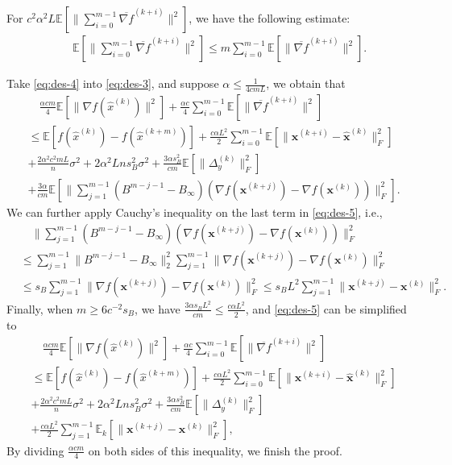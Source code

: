 \documentclass[10pt]{article}
\newcommand{\vx}{{\mathbf{x}}}
\newcommand{\EE}{\mathbb{E}}
\newcommand{\norm}[1]{\| #1 \|}
\begin{document}
For \(c^2\alpha^2L\EE[\norm{\sum_{i=0}^{m-1}\overline{\nabla f}^{(k+i)}}^2]\), we have the following estimate:
\begin{align}\label{eq:des-4}
    &\quad\EE[\norm{\sum_{i=0}^{m-1}\overline{\nabla f}^{(k+i)}}^2]\le m\sum_{i=0}^{m-1}\EE[\norm{\overline{\nabla f}^{(k+i)}}^2].
\end{align}

Take \eqref{eq:des-4} into \eqref{eq:des-3}, and suppose $\alpha \le \frac{1}{4cmL}$, we obtain that
\begin{align}\label{eq:des-5}
    &\quad\frac{\alpha cm}{4}\EE[\norm{\nabla f(\hat{x}^{(k)})}^2]+\frac{\alpha c}{4}\sum_{i=0}^{m-1}\EE[\norm{\overline{\nabla f}^{(k+i)}}^2]\\
    &\le \EE[f(\hat{x}^{(k)})-f(\hat{x}^{(k+m)})]+\frac{c\alpha L^2}{2}\sum_{i=0}^{m-1}\EE[\norm{\vx^{(k+i)}-\hat{\vx}^{(k)}}_F^2]\nonumber\\
    &+\frac{2\alpha^2c^2mL}{n}\sigma^2+2\alpha^2Lns_B^2\sigma^2+\frac{3\alpha s_B^2}{cm}\EE[\norm{\Delta_y^{(k)}}_F^2]\nonumber\\
    &+\frac{3\alpha}{cm}\EE[\norm{\sum_{j=1}^{m-1}(B^{m-j-1}-B_\infty)(\nabla f(\vx^{(k+j)})-\nabla f(\vx^{(k)}))}_F^2]\nonumber.
\end{align}
We can further apply Cauchy's inequality on the last term in \eqref{eq:des-5}, i.e.,
\begin{align*}
    &\quad\norm{\sum_{j=1}^{m-1}(B^{m-j-1}-B_\infty)(\nabla f(\vx^{(k+j)})-\nabla f(\vx^{(k)}))}_F^2\\
    &\le \sum_{j=1}^{m-1}\norm{B^{m-j-1}-B_\infty}_2^2\sum_{j=1}^{m-1}\norm{\nabla f(\vx^{(k+j)})-\nabla f(\vx^{(k)})}_F^2\\
    &\le s_B\sum_{j=1}^{m-1}\norm{\nabla f(\vx^{(k+j)})-\nabla f(\vx^{(k)})}_F^2\le s_BL^2 \sum_{j=1}^{m-1}\norm{\vx^{(k+j)}-\vx^{(k)}}_F^2.
\end{align*}
Finally, when $m\ge 6c^{-2}s_B$, we have $\frac{3\alpha s_B L^2}{cm}\le \frac{c\alpha L^2}{2}$, and \eqref{eq:des-5} can be simplified to 
\begin{align*}
    &\quad\frac{\alpha cm}{4}\EE[\norm{\nabla f(\hat{x}^{(k)})}^2]+\frac{\alpha c}{4}\sum_{i=0}^{m-1}\EE[\norm{\overline{\nabla f}^{(k+i)}}^2]\\
    &\le \EE[f(\hat{x}^{(k)})-f(\hat{x}^{(k+m)})]+\frac{c\alpha L^2}{2}\sum_{i=0}^{m-1}\EE[\norm{\vx^{(k+i)}-\hat{\vx}^{(k)}}_F^2]\nonumber\\
    &+\frac{2\alpha^2c^2mL}{n}\sigma^2+2\alpha^2Lns_B^2\sigma^2+\frac{3\alpha s_B^2}{cm}\EE[\norm{\Delta_y^{(k)}}_F^2]\nonumber\\
    &+\frac{c\alpha L^2}{2}\sum_{j=1}^{m-1} \EE_k[\norm{\vx^{(k+j)}-\vx^{(k)}}_F^2]\nonumber,
\end{align*}
By dividing $\frac{\alpha cm}{4}$ on both sides of this inequality, we finish the proof. 
\end{document}
